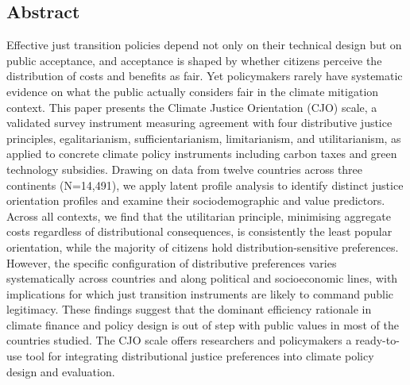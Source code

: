 \documentclass[10pt,letterpaper]{article}
\begin{document}
\subsection*{Abstract}
\small

Effective just transition policies depend not only on their technical design but on public acceptance, and acceptance is shaped by whether citizens perceive the distribution of costs and benefits as fair. Yet policymakers rarely have systematic evidence on what the public actually considers fair in the climate mitigation context. This paper presents the Climate Justice Orientation (CJO) scale, a validated survey instrument measuring agreement with four distributive justice principles, egalitarianism, sufficientarianism, limitarianism, and utilitarianism, as applied to concrete climate policy instruments including carbon taxes and green technology subsidies. Drawing on data from twelve countries across three continents (N=14,491), we apply latent profile analysis to identify distinct justice orientation profiles and examine their sociodemographic and value predictors. Across all contexts, we find that the utilitarian principle, minimising aggregate costs regardless of distributional consequences, is consistently the least popular orientation, while the majority of citizens hold distribution-sensitive preferences. However, the specific configuration of distributive preferences varies systematically across countries and along political and socioeconomic lines, with implications for which just transition instruments are likely to command public legitimacy. These findings suggest that the dominant efficiency rationale in climate finance and policy design is out of step with public values in most of the countries studied. The CJO scale offers researchers and policymakers a ready-to-use tool for integrating distributional justice preferences into climate policy design and evaluation.
\end{document}

